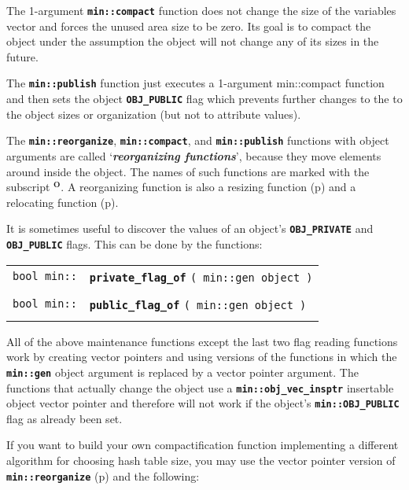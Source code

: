 \documentclass[12pt]{article}
\makeatletter
\newcommand{\TT}[1]{{\tt \bfseries #1}}
\newcommand{\skey}[2]{{\bf \em #1#2}\index{#1}}
\newcommand{\ttindex}[1]{\index{#1@{\tt #1}}}
\newcommand{\subsmkey}[2]{$\mathbf{^{#1}}$\index{#1@$^{#1}$!#2}}
\newcommand{\pagref}[1]{p\pageref{#1}}
\newcommand{\EOL}{\penalty \exhyphenpenalty}
\newenvironment{indpar}[1][0.3in]%
	{\begin{list}{}%
		     {\setlength{\itemsep}{0in}%
		      \setlength{\topsep}{0in}%
		      \setlength{\parsep}{1ex}%
		      \setlength{\labelwidth}{#1}%
		      \setlength{\leftmargin}{#1}%
		      \addtolength{\leftmargin}{\labelsep}}%
	 \item}%
	{\end{list}}
\newcommand{\LABEL}[1]{\label{#1}}
\newcommand{\MINKEY}[1]%
	   {\TT{#1}\ttindex{min::#1}\ttindex{#1}}
\makeatother
\begin{document}
The 1-argument \TT{min::compact} function does not change the
size of the variables vector and forces the unused area size
to be zero.  Its goal is to compact the object under the assumption
the object will not change any of its sizes in the future.

The \TT{min::publish} function just executes a
1-argument {min::compact} function and then sets
the object \TT{OBJ\_\EOL PUBLIC} flag which prevents further changes to the
to the object sizes or organization (but not to attribute values).

The \TT{min::reorganize}, \TT{min::compact}, and \TT{min::\EOL publish}
functions with object arguments
are called `\skey{reorganizing function}s'\label{REORGANIZING-FUNCTIONS},
because they move elements around inside the object.
The names of such functions are marked with the subscript
\subsmkey{O}{of function}.
A reorganizing function is also a resizing function
(\pagref{RESIZING-FUNCTIONS}) and
a relocating function (\pagref{RELOCATING-FUNCTIONS}).

It is sometimes useful to discover the values of an object's
\TT{OBJ\_\EOL PRIVATE} and \TT{OBJ\_\EOL PUBLIC} flags.
This can be done by the functions:

\begin{indpar}\begin{tabular}{r@{}l}
\verb|bool min::| & \MINKEY{private\_flag\_of}
    \verb|( min::gen object )| \\
\LABEL{MIN::PRIVATE_FLAG_OF} \\
\verb|bool min::| & \MINKEY{public\_flag\_of}
    \verb|( min::gen object )| \\
\LABEL{MIN::PUBLIC_FLAG_OF} \\
\end{tabular}\end{indpar}

All of the above maintenance functions except the last two
flag reading functions work by creating
vector pointers and using versions of the functions in which the
\TT{min::gen} object argument is replaced by a vector pointer argument.
The functions that actually change the object use a
\TT{min::\EOL obj\_\EOL vec\_\EOL insptr} insertable object
vector pointer and therefore will not work if the object's
\TT{min::\EOL OBJ\_\EOL PUBLIC} flag as already been set.

If you want to build your own compactification function implementing
a different algorithm for choosing hash table size, you may use
the vector pointer version of \TT{min::reorganize}
(\pagref{MIN::REORGANIZE_OBJ_VEC_INSPTR}) and the following:
\end{document}
